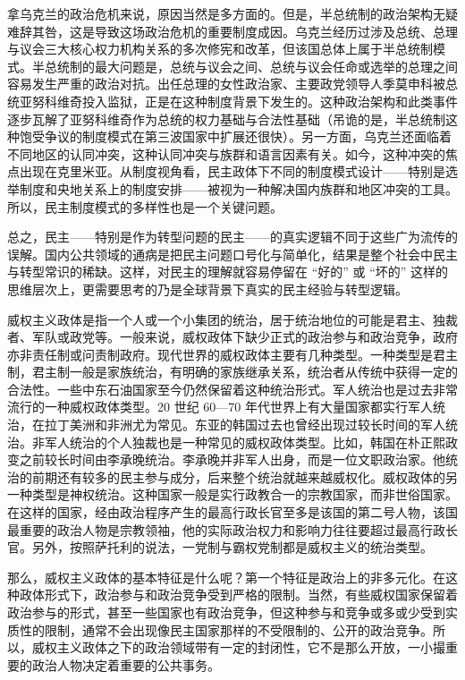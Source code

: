 拿乌克兰的政治危机来说，原因当然是多方面的。但是，半总统制的政治架构无疑难辞其咎，这是导致这场政治危机的重要制度成因。乌克兰经历过涉及总统、总理与议会三大核心权力机构关系的多次修宪和改革，但该国总体上属于半总统制模式。半总统制的最大问题是，总统与议会之间、总统与议会任命或选举的总理之间容易发生严重的政治对抗。出任总理的女性政治家、主要政党领导人季莫申科被总统亚努科维奇投入监狱，正是在这种制度背景下发生的。这种政治架构和此类事件逐步瓦解了亚努科维奇作为总统的权力基础与合法性基础（吊诡的是，半总统制这种饱受争议的制度模式在第三波国家中扩展还很快）。另一方面，乌克兰还面临着不同地区的认同冲突，这种认同冲突与族群和语言因素有关。如今，这种冲突的焦点出现在克里米亚。从制度视角看，民主政体下不同的制度模式设计——特别是选举制度和央地关系上的制度安排——被视为一种解决国内族群和地区冲突的工具。所以，民主制度模式的多样性也是一个关键问题。

总之，民主——特别是作为转型问题的民主——的真实逻辑不同于这些广为流传的误解。国内公共领域的通病是把民主问题口号化与简单化，结果是整个社会中民主与转型常识的稀缺。这样，对民主的理解就容易停留在 “好的” 或 “坏的” 这样的思维层次上，更需要思考的乃是全球背景下真实的民主经验与转型逻辑。


威权主义政体是指一个人或一个小集团的统治，居于统治地位的可能是君主、独裁者、军队或政党等。一般来说，威权政体下缺少正式的政治参与和政治竞争，政府亦非责任制或问责制政府。现代世界的威权政体主要有几种类型。一种类型是君主制，君主制一般是家族统治，有明确的家族继承关系，统治者从传统中获得一定的合法性。一些中东石油国家至今仍然保留着这种统治形式。军人统治也是过去非常流行的一种威权政体类型。20 世纪 60—70 年代世界上有大量国家都实行军人统治，在拉丁美洲和非洲尤为常见。东亚的韩国过去也曾经出现过较长时间的军人统治。非军人统治的个人独裁也是一种常见的威权政体类型。比如，韩国在朴正熙政变之前较长时间由李承晚统治。李承晚并非军人出身，而是一位文职政治家。他统治的前期还有较多的民主参与成分，后来整个统治就越来越威权化。威权政体的另一种类型是神权统治。这种国家一般是实行政教合一的宗教国家，而非世俗国家。在这样的国家，经由政治程序产生的最高行政长官至多是该国的第二号人物，该国最重要的政治人物是宗教领袖，他的实际政治权力和影响力往往要超过最高行政长官。另外，按照萨托利的说法，一党制与霸权党制都是威权主义的统治类型。

那么，威权主义政体的基本特征是什么呢？第一个特征是政治上的非多元化。在这种政体形式下，政治参与和政治竞争受到严格的限制。当然，有些威权国家保留着政治参与的形式，甚至一些国家也有政治竞争，但这种参与和竞争或多或少受到实质性的限制，通常不会出现像民主国家那样的不受限制的、公开的政治竞争。所以，威权主义政体之下的政治领域带有一定的封闭性，它不是那么开放，一小撮重要的政治人物决定着重要的公共事务。

